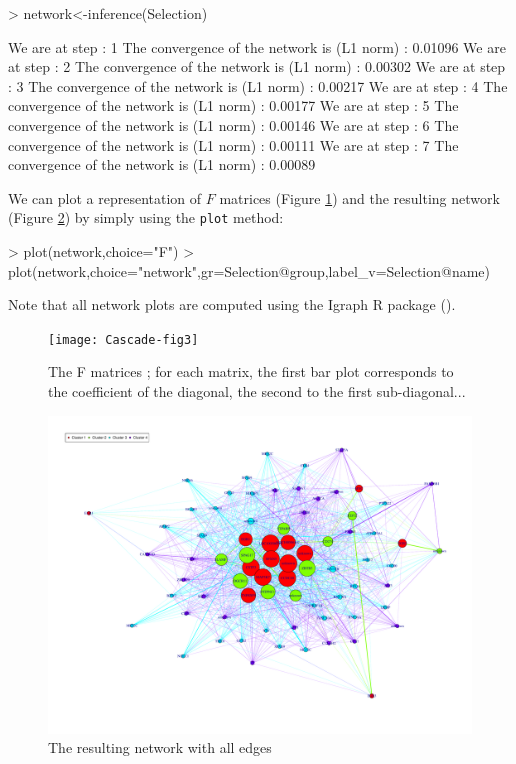 \documentclass[a4paper]{article}
\begin{document}
\begin{Schunk}
\begin{Sinput}
> network<-inference(Selection)
\end{Sinput}
\begin{Soutput}
We are at step :  1
The convergence of the network is (L1 norm) : 0.01096
We are at step :  2
The convergence of the network is (L1 norm) : 0.00302
We are at step :  3
The convergence of the network is (L1 norm) : 0.00217
We are at step :  4
The convergence of the network is (L1 norm) : 0.00177
We are at step :  5
The convergence of the network is (L1 norm) : 0.00146
We are at step :  6
The convergence of the network is (L1 norm) : 0.00111
We are at step :  7
The convergence of the network is (L1 norm) : 0.00089
\end{Soutput}
\end{Schunk}



We can plot a representation of $F$ matrices (Figure \ref{F1}) and the resulting network (Figure \ref{net1}) by simply using the \texttt{plot} method:
\begin{Schunk}
\begin{Sinput}
> plot(network,choice="F")
> plot(network,choice="network",gr=Selection@group,label_v=Selection@name)
\end{Sinput}
\end{Schunk}

Note that all network plots are computed using the Igraph R package (\cite{igraph}). \\ 



\begin{figure}
\centering
\texttt{[image: Cascade-fig3]}
\caption{The F matrices ; for each matrix, the first bar plot corresponds to the coefficient of the diagonal, the second to the first sub-diagonal...}\label{F1}
\end{figure}

\begin{figure}
\centering
\includegraphics[clip=true,trim= 2cm 1cm 1mm 1cm,angle=90,width=18cm]{Cascade-fig4}
\caption{The resulting network with all edges}\label{net1}
\end{figure}
\restoregeometry
\end{document}
